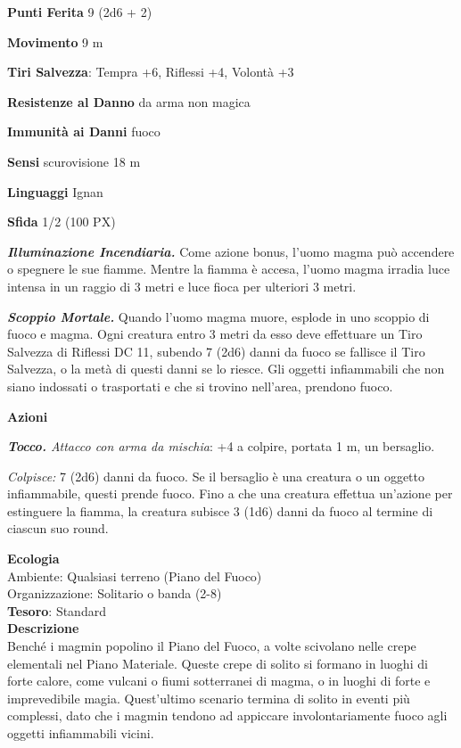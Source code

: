 \begin{multicols}{2}
	\textbf{Punti Ferita} 9 (2d6 + 2)

	\textbf{Movimento} 9 m

	\textbf{Tiri Salvezza}: Tempra +6, Riflessi +4, Volontà +3

	\textbf{Resistenze al Danno} da arma non magica

	\textbf{Immunità ai Danni} fuoco

	\textbf{Sensi} scurovisione 18 m

	\textbf{Linguaggi} Ignan

	\textbf{Sfida} 1/2 (100 PX)

	\textit{\textbf{Illuminazione Incendiaria.}} Come azione bonus, l'uomo magma può accendere o spegnere le sue fiamme. Mentre la fiamma è accesa, l'uomo magma irradia luce intensa in un raggio di 3 metri e luce fioca per ulteriori 3 metri.

	\textit{\textbf{Scoppio Mortale.}} Quando l'uomo magma muore, esplode in uno scoppio di fuoco e magma. Ogni creatura entro 3 metri da esso deve effettuare un Tiro Salvezza di Riflessi DC 11, subendo 7 (2d6) danni da fuoco se fallisce il Tiro Salvezza, o la metà di questi danni se lo riesce. Gli oggetti infiammabili che non siano indossati o trasportati e che si trovino nell'area, prendono fuoco.

	\textbf{Azioni}

	\textit{\textbf{Tocco.} Attacco con arma da mischia}: +4 a colpire, portata 1 m, un bersaglio.

	\textit{Colpisce:} 7 (2d6) danni da fuoco. Se il bersaglio è una creatura o un oggetto infiammabile, questi prende fuoco. Fino a che una creatura effettua un'azione per estinguere la fiamma, la creatura subisce 3 (1d6) danni da fuoco al termine di ciascun suo round.

	\textbf{Ecologia}\\
	Ambiente: Qualsiasi terreno (Piano del Fuoco)\\
	Organizzazione: Solitario o banda (2-8)\\
	\textbf{Tesoro}: Standard\\
	\textbf{Descrizione}\\
	Benché i magmin popolino il Piano del Fuoco, a volte scivolano nelle crepe elementali nel Piano Materiale. Queste crepe di solito si formano in luoghi di forte calore, come vulcani o fiumi sotterranei di magma, o in luoghi di forte e imprevedibile magia. Quest'ultimo scenario termina di solito in eventi più complessi, dato che i magmin tendono ad appiccare involontariamente fuoco agli oggetti infiammabili vicini.


\end{multicols}
